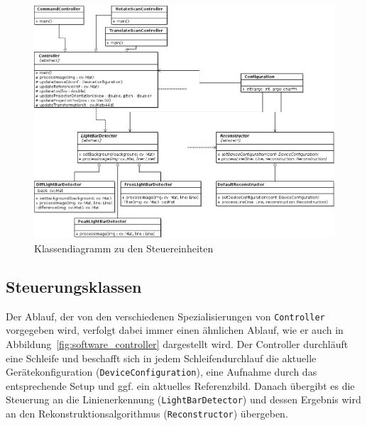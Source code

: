 \documentclass[ngerman,a4paper,parskip=half]{scrartcl}
\begin{document}
\begin{figure}[H]
	\centering
	\includegraphics[width=\linewidth]{includes/classdiagram_control.png}
	\caption{Klassendiagramm zu den Steuereinheiten}
	\label{fig:classes_control}
\end{figure}

\subsection{Steuerungsklassen}
\label{sec:controller}

Der Ablauf, der von den verschiedenen Spezialisierungen von \texttt{Controller} vorgegeben wird, verfolgt dabei immer einen ähnlichen Ablauf, wie er auch in Abbildung~\ref{fig:software_controller} dargestellt wird. Der Controller durchläuft eine Schleife und beschafft sich in jedem Schleifendurchlauf die aktuelle Gerätekonfiguration (\texttt{DeviceConfiguration}), eine Aufnahme durch das entsprechende Setup und ggf. ein aktuelles Referenzbild. Danach übergibt es die Steuerung an die Linienerkennung (\texttt{LightBarDetector}) und dessen Ergebnis wird an den Rekonstruktionsalgorithmus (\texttt{Reconstructor}) übergeben.
\end{document}
